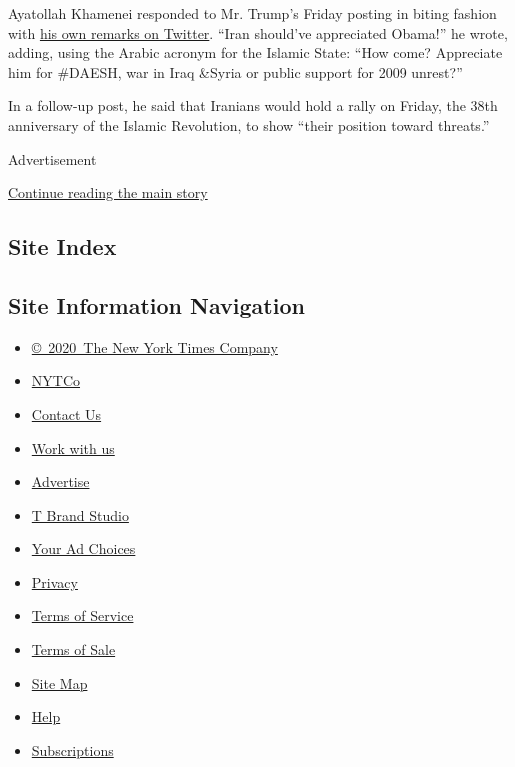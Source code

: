 Ayatollah Khamenei responded to Mr. Trump's Friday posting in biting
fashion with
\href{https://twitter.com/khamenei_ir/status/828904285312315393}{his own
remarks on Twitter}. ``Iran should've appreciated Obama!'' he wrote,
adding, using the Arabic acronym for the Islamic State: ``How come?
Appreciate him for \#DAESH, war in Iraq \&Syria or public support for
2009 unrest?''

In a follow-up post, he said that Iranians would hold a rally on Friday,
the 38th anniversary of the Islamic Revolution, to show ``their position
toward threats.''

Advertisement

\protect\hyperlink{after-bottom}{Continue reading the main story}

\hypertarget{site-index}{%
\subsection{Site Index}\label{site-index}}

\hypertarget{site-information-navigation}{%
\subsection{Site Information
Navigation}\label{site-information-navigation}}

\begin{itemize}
\tightlist
\item
  \href{https://help.nytimes3xbfgragh.onion/hc/en-us/articles/115014792127-Copyright-notice}{©~2020~The
  New York Times Company}
\end{itemize}

\begin{itemize}
\tightlist
\item
  \href{https://www.nytco.com/}{NYTCo}
\item
  \href{https://help.nytimes3xbfgragh.onion/hc/en-us/articles/115015385887-Contact-Us}{Contact
  Us}
\item
  \href{https://www.nytco.com/careers/}{Work with us}
\item
  \href{https://nytmediakit.com/}{Advertise}
\item
  \href{http://www.tbrandstudio.com/}{T Brand Studio}
\item
  \href{https://www.nytimes3xbfgragh.onion/privacy/cookie-policy\#how-do-i-manage-trackers}{Your
  Ad Choices}
\item
  \href{https://www.nytimes3xbfgragh.onion/privacy}{Privacy}
\item
  \href{https://help.nytimes3xbfgragh.onion/hc/en-us/articles/115014893428-Terms-of-service}{Terms
  of Service}
\item
  \href{https://help.nytimes3xbfgragh.onion/hc/en-us/articles/115014893968-Terms-of-sale}{Terms
  of Sale}
\item
  \href{https://spiderbites.nytimes3xbfgragh.onion}{Site Map}
\item
  \href{https://help.nytimes3xbfgragh.onion/hc/en-us}{Help}
\item
  \href{https://www.nytimes3xbfgragh.onion/subscription?campaignId=37WXW}{Subscriptions}
\end{itemize}
